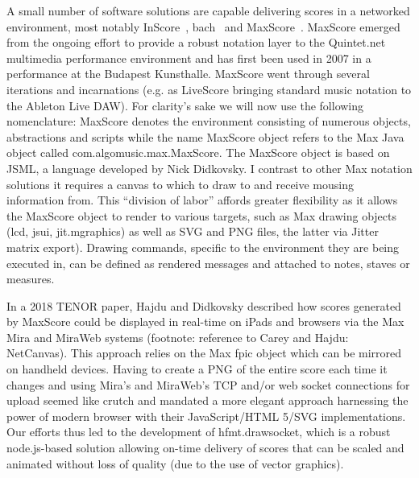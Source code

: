 
A small number of software solutions are capable delivering scores in a networked environment, most notably InScore~\cite{fober2013programming}, bach~\cite{agostini2015max} and MaxScore~\cite{didkovsky2008maxscore}. MaxScore emerged from the ongoing effort to provide a robust notation layer to the Quintet.net multimedia performance environment and has first been used in 2007 in a performance at the Budapest Kunsthalle. MaxScore went through several iterations and incarnations (e.g. as LiveScore bringing standard music notation to the Ableton Live DAW).
For clarity’s sake we will now use the following nomenclature: MaxScore denotes the environment consisting of numerous objects, abstractions and scripts while the name MaxScore object refers to the Max Java object called com.algomusic.max.MaxScore. The MaxScore object is based on JSML, a language developed by Nick Didkovsky. I contrast to other Max notation solutions it requires a canvas to which to draw to and receive mousing information from. This “division of labor” affords greater flexibility as it allows the MaxScore object to render to various targets, such as Max drawing objects (lcd, jsui, jit.mgraphics) as well as SVG and PNG files, the latter via Jitter matrix export). Drawing commands, specific to the environment they are being executed in, can be defined as rendered messages and attached to notes, staves or measures. 

In a 2018 TENOR paper, Hajdu and Didkovsky described how scores generated by MaxScore could be displayed in real-time on iPads and browsers via the Max Mira and MiraWeb systems (footnote: reference to Carey and Hajdu: NetCanvas). This approach relies on the Max fpic object which can be mirrored on handheld devices. Having to create a PNG of the entire score each time it changes and using Mira’s and MiraWeb’s TCP and/or web socket connections for upload seemed like crutch and mandated a more elegant approach harnessing the power of modern browser with their JavaScript/HTML 5/SVG implementations. Our efforts thus led to the development of hfmt.drawsocket, which is a robust node.js-based solution allowing on-time delivery of scores that can be scaled and animated without loss of quality (due to the use of vector graphics). 





